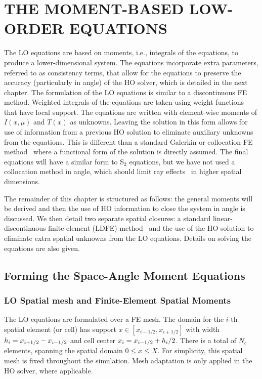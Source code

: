 
\chapter{\uppercase{The Moment-Based Low-Order Equations}}
\label{chp:lo}

The LO equations are based on moments, i.e., integrals of the equations, to produce a
lower-dimensional system.  The equations incorporate extra parameters, referred to as
consistency terms, that allow for the equations to preserve the accuracy (particularly in
angle) of the HO solver, which is detailed in the next chapter. 
The formulation of the LO equations is similar to a discontinuous FE method.  Weighted
integrals of the equations are taken using weight functions that have local support. 
The equations are written with element-wise moments of $I(x,\mu)$ and $T(x)$ as
unknowns.  Leaving the solution in this form allows for use of information from a
previous HO solution to eliminate auxiliary unknowns from the equations. This is different
than a standard Galerkin or collocation FE
method~\cite{morel_ldtrt,morel_notes} where a
functional form of the solution is directly assumed. The final equations will have a
similar form to S$_2$ equations, but we have not used a collocation method in angle,
which should limit ray effects~\cite{morel_notes,lewis} in higher spatial dimensions.

The remainder of this chapter is structured as follows: the general moments will be
derived and then the use of HO information to close the system in angle is discussed.
We then detail two separate spatial closures: a standard linear-discontinuous finite-element (LDFE)
method~\cite{morel_ldtrt} and the use of the HO solution to eliminate extra
spatial unknowns from the LO equations.  Details on solving the equations are also given.

\section{Forming the Space-Angle Moment Equations}

\subsection{LO Spatial mesh and Finite-Element Spatial Moments}

The LO equations are formulated over a FE mesh.  The domain for the $i$-th spatial
element (or cell) has support $x\in[x_{i-1/2},x_{i+1/2}]$ with width $h_i=x_{i+1/2} -
x_{{i-1/2}}$ and cell center 
$x_i = x_{{i-1/2}} + h_i/2$.  There is a total of $N_c$ elements, spanning the
spatial domain $0\leq x\leq X$.  For simplicity, this spatial mesh is fixed throughout the
simulation.  Mesh adaptation is only applied in the HO solver, where applicable.

